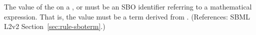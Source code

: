 The value of the   on a \AlgebraicRule, \RateRule or
\AssignmentRule must be an SBO identifier referring to a mathematical
expression.  That is, the value must be a term derived from
\sbomathformula.  (References: SBML L2v2
Section~\ref{sec:rule-sboterm}.)
